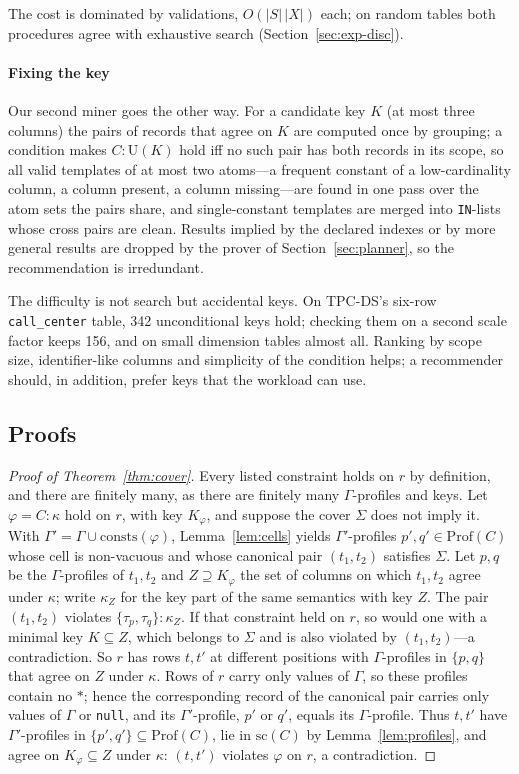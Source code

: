 \documentclass[conference]{IEEEtran}
\theoremstyle{definition}
\newcommand{\sql}[1]{\texttt{#1}}
\newcommand{\nul}{\texttt{null}}
\newcommand{\Sig}{\Sigma}
\newcommand{\U}[1]{\mathrm{U}(#1)}
\newcommand{\scope}{\mathrm{sc}}
\newcommand{\Prof}{\mathrm{Prof}}
\newcommand{\consts}{\mathrm{consts}}
\begin{document}
The cost is dominated by validations, $O(|S|\,|X|)$ each; on random tables both procedures
agree with exhaustive search (Section~\ref{sec:exp-disc}).

\paragraph*{Fixing the key} Our second miner goes the other way. For a candidate key $K$
(at most three columns) the pairs of records that agree on $K$ are computed once by grouping; a
condition makes $C:\U{K}$ hold iff no such pair has both records in its scope, so all valid
templates of at most two atoms---a frequent constant of a low-cardinality column, a column
present, a column missing---are found in one pass over the atom sets the pairs share, and
single-constant templates are merged into \sql{IN}-lists whose cross pairs are
clean. Results implied by the declared indexes or by more general results are dropped
by the prover of Section~\ref{sec:planner}, so the recommendation is irredundant.

The difficulty is not search but accidental keys. On TPC-DS's six-row \sql{call\_center} table,
342 unconditional keys hold; checking them on a second scale factor keeps 156, and on small
dimension tables almost all. Ranking by scope size, identifier-like columns and simplicity of the
condition helps; a recommender should, in addition, prefer keys that the workload can use.

\subsection{Proofs}

\begin{proof}[Proof of Theorem~\ref{thm:cover}]
Every listed constraint holds on $r$ by definition, and there are finitely many, as there are
finitely many $\Gamma$-profiles and keys. Let $\varphi=C:\kappa$ hold on $r$, with key $K_\varphi$, and
suppose the cover $\Sig$ does not imply it. With $\Gamma'=\Gamma\cup\consts(\varphi)$,
Lemma~\ref{lem:cells} yields $\Gamma'$-profiles $p',q'\in\Prof(C)$ whose cell is non-vacuous and
whose canonical pair $(t_1,t_2)$ satisfies $\Sig$. Let $p,q$ be the $\Gamma$-profiles of $t_1,t_2$
and $Z\supseteq K_\varphi$ the set of columns on which $t_1,t_2$ agree under $\kappa$; write
$\kappa_Z$ for the key part of the same semantics with key $Z$. The pair $(t_1,t_2)$ violates
$\{\tau_p,\tau_q\}:\kappa_Z$. If that constraint held on $r$, so would one with a minimal key
$K\subseteq Z$, which belongs to $\Sig$ and is also violated by $(t_1,t_2)$---a contradiction. So
$r$ has rows $t,t'$ at different positions with $\Gamma$-profiles in $\{p,q\}$ that agree on $Z$
under $\kappa$. Rows of $r$ carry only values of $\Gamma$, so these profiles contain no $*$; hence
the corresponding record of the canonical pair carries only values of $\Gamma$ or \nul, and its
$\Gamma'$-profile, $p'$ or $q'$, equals its $\Gamma$-profile. Thus $t,t'$ have $\Gamma'$-profiles in
$\{p',q'\}\subseteq\Prof(C)$, lie in $\scope(C)$ by Lemma~\ref{lem:profiles}, and agree on
$K_\varphi\subseteq Z$ under $\kappa$: $(t,t')$ violates $\varphi$ on $r$, a contradiction.
\end{proof}
\end{document}
